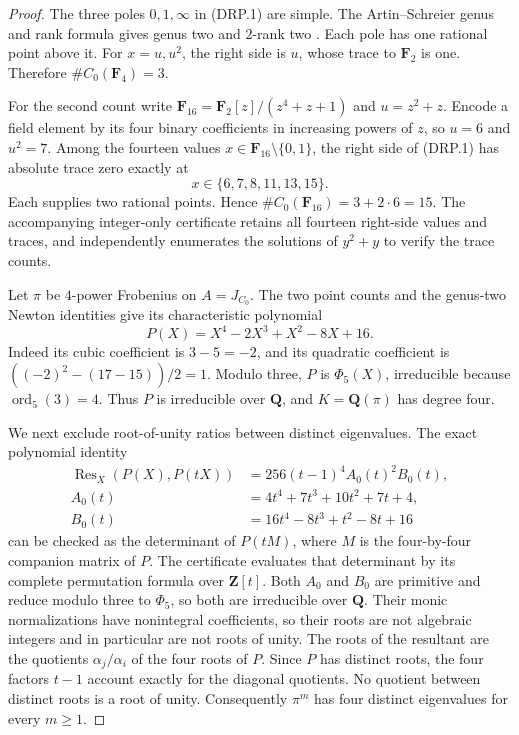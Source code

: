 \begin{proof}
The three poles $0,1,\infty$ in (DRP.1) are simple. The
Artin--Schreier genus and rank formula gives genus two and $2$-rank
two \cite[Lemma~2.6]{PriesZhu2012}. Each pole has one rational point
above it. For $x=u,u^2$, the right side is $u$, whose trace to
$\mathbf F_2$ is one. Therefore $\#C_0(\mathbf F_4)=3$.

For the second count write
$\mathbf F_{16}=\mathbf F_2[z]/(z^4+z+1)$ and $u=z^2+z$.
Encode a field element by its four binary coefficients in increasing
powers of $z$, so $u=6$ and $u^2=7$. Among the fourteen values
$x\in\mathbf F_{16}\setminus\{0,1\}$, the right side of
(DRP.1) has absolute trace zero exactly at
\[
                         x\in\{6,7,8,11,13,15\}.
 \tag{DRP.2}
\]
Each supplies two rational points. Hence
$\#C_0(\mathbf F_{16})=3+2\cdot6=15$.
The accompanying integer-only certificate retains all fourteen
right-side values and traces, and independently enumerates the
solutions of $y^2+y$ to verify the trace counts.

Let $\pi$ be $4$-power Frobenius on $A=J_{C_0}$. The two point
counts and the genus-two Newton identities give its characteristic
polynomial
\[
                    P(X)=X^4-2X^3+X^2-8X+16.
 \tag{DRP.3}
\]
Indeed its cubic coefficient is $3-5=-2$, and its quadratic
coefficient is $((-2)^2-(17-15))/2=1$.
Modulo three, $P$ is $\Phi_5(X)$, irreducible because
$\operatorname{ord}_5(3)=4$. Thus $P$ is irreducible over
$\mathbf Q$, and $K=\mathbf Q(\pi)$ has degree four.

We next exclude root-of-unity ratios between distinct eigenvalues.
The exact polynomial identity
\[
 \begin{aligned}
 \operatorname{Res}_X(P(X),P(tX))
   &=256(t-1)^4 A_0(t)^2 B_0(t),\\
 A_0(t)&=4t^4+7t^3+10t^2+7t+4,\\
 B_0(t)&=16t^4-8t^3+t^2-8t+16
 \end{aligned}
 \tag{DRP.4}
\]
can be checked as the determinant of $P(tM)$, where $M$ is the
four-by-four companion matrix of $P$. The certificate evaluates that
determinant by its complete permutation formula over $\mathbf Z[t]$.
Both $A_0$ and $B_0$ are primitive and reduce modulo three to
$\Phi_5$, so both are irreducible over $\mathbf Q$. Their monic
normalizations have nonintegral coefficients, so their roots are not
algebraic integers and in particular are not roots of unity.
The roots of the resultant are the quotients $\alpha_j/\alpha_i$
of the four roots of $P$. Since $P$ has distinct roots, the four
factors $t-1$ account exactly for the diagonal quotients. No quotient
between distinct roots is a root of unity. Consequently $\pi^m$
has four distinct eigenvalues for every $m\ge1$.


\end{proof}
